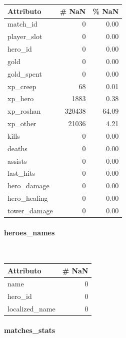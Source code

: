 \documentclass[a4paper,12pt,openany,oneside]{book}
\newcommand{\myparagraph}[1]{\paragraph{#1}\mbox{}\\[0.8em]}
\begin{document}
\begin{table}[htb]
	\tiny	
	\centering	
	\begin{tabularx}{0.25\textwidth}{lrr} 
		Attributo     &    \# NaN  &    \% NaN \\
		\midrule
		match\_id      &        0   &    0.00 \\
		player\_slot   &        0   &    0.00 \\
		hero\_id       &        0   &    0.00 \\
		gold          &        0   &    0.00 \\
		gold\_spent    &        0   &    0.00 \\
		xp\_creep      &       68   &    0.01 \\
		xp\_hero       &     1883   &    0.38 \\
		xp\_roshan     &   320438   &   64.09 \\
		xp\_other      &    21036   &    4.21 \\
		kills         &        0   &    0.00 \\
		deaths        &        0   &    0.00 \\
		assists       &        0   &    0.00 \\
		last\_hits     &        0   &    0.00 \\
		hero\_damage   &        0   &    0.00 \\
		hero\_healing  &        0   &    0.00 \\
		tower\_damage  &        0   &    0.00 \\
	\end{tabularx}
	\label{tab:comp_matches}
\end{table}
\myparagraph{heroes\_names}
\begin{table}[H]	
	\centering	
	\begin{tabularx}{0.30\textwidth}{lr} 
		Attributo    &   \# NaN \\
		\midrule
		name            &  0 \\
		hero\_id         &  0 \\
		localized\_name  &  0 \\
	\end{tabularx}
\end{table}
\noindent
\myparagraph{matches\_stats}
\end{document}
